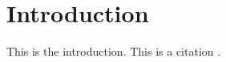 
\chapter{Introduction}
\label{chap:intro}

This is the introduction. This is a citation \citep{goldreich_pulsar_1969}.
